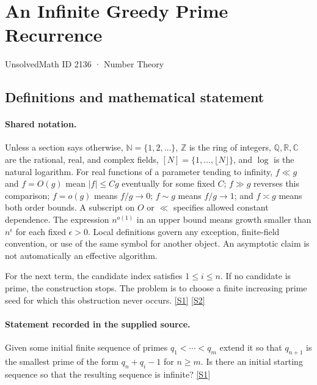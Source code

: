 \documentclass[11pt,a4paper]{article}
\newcommand{\N}{\mathbb{N}}
\newcommand{\Z}{\mathbb{Z}}
\newcommand{\Q}{\mathbb{Q}}
\newcommand{\R}{\mathbb{R}}
\newcommand{\C}{\mathbb{C}}
\newcommand{\sref}[2]{\hyperlink{source:#1:#2}{[S#2]}}
\begin{document}

\setcounter{section}{2135}

\section{An Infinite Greedy Prime Recurrence}\label{2136}

{\small\sffamily UnsolvedMath ID 2136 · Number Theory}

\subsection{Definitions and mathematical statement}

\paragraph{Shared notation.}Unless a section says otherwise, $\N=\{1,2,\ldots\}$,
$\Z$ is the ring of integers, $\Q,\R,\C$ are the rational, real, and complex
fields, $[N]=\{1,\ldots,\lfloor N\rfloor\}$, and $\log$ is the natural
logarithm. For real functions of a parameter tending to infinity,
$f\ll g$ and $f=O(g)$ mean $|f|\leq Cg$ eventually for some fixed $C$;
$f\gg g$ reverses this comparison; $f=o(g)$ means $f/g\to0$;
$f\sim g$ means $f/g\to1$; and $f\asymp g$ means both order bounds.
A subscript on $O$ or $\ll$ specifies allowed constant dependence.
The expression $n^{o(1)}$ in an upper bound means growth smaller than
$n^\epsilon$ for each fixed $\epsilon>0$. Local definitions govern any
exception, finite-field convention, or use of the same symbol for another
object. An asymptotic claim is not automatically an effective algorithm.



For the next term, the candidate index satisfies $1\leq i\leq n$. If no candidate is prime, the construction stops. The problem is to choose a finite increasing prime seed for which this obstruction never occurs. \sref{2136}{1} \sref{2136}{2}

\paragraph{Statement recorded in the supplied source.}
Given some initial finite sequence of primes $q_1<\cdots<q_m$ extend it so that $q_{n+1}$ is the smallest prime of the form $q_n+q_i-1$ for $n\geq m$. Is there an initial starting sequence so that the resulting sequence is infinite? \sref{2136}{1}
\end{document}
